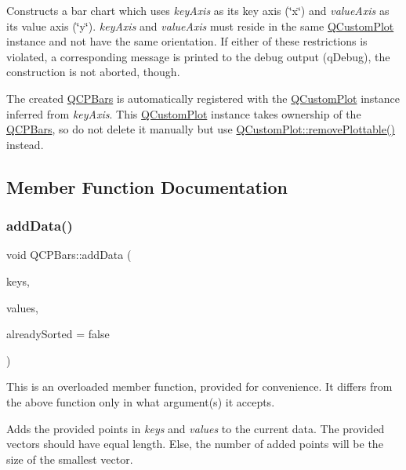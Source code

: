 Constructs a bar chart which uses {\itshape key\+Axis} as its key axis (\char`\"{}x\char`\"{}) and {\itshape value\+Axis} as its value axis (\char`\"{}y\char`\"{}). {\itshape key\+Axis} and {\itshape value\+Axis} must reside in the same \hyperlink{classQCustomPlot}{Q\+Custom\+Plot} instance and not have the same orientation. If either of these restrictions is violated, a corresponding message is printed to the debug output (q\+Debug), the construction is not aborted, though.

The created \hyperlink{classQCPBars}{Q\+C\+P\+Bars} is automatically registered with the \hyperlink{classQCustomPlot}{Q\+Custom\+Plot} instance inferred from {\itshape key\+Axis}. This \hyperlink{classQCustomPlot}{Q\+Custom\+Plot} instance takes ownership of the \hyperlink{classQCPBars}{Q\+C\+P\+Bars}, so do not delete it manually but use \hyperlink{classQCustomPlot_af3dafd56884208474f311d6226513ab2}{Q\+Custom\+Plot\+::remove\+Plottable()} instead. 

\subsection{Member Function Documentation}
\mbox{\label{classQCPBars_a323d6970d6d6e3166d89916a7f60f733}} 
\subsubsection{\texorpdfstring{add\+Data()}{addData()}\hspace{0.1cm}{\footnotesize\ttfamily [1/2]}}
{\footnotesize\ttfamily void Q\+C\+P\+Bars\+::add\+Data (\begin{DoxyParamCaption}\item[{const Q\+Vector$<$ double $>$ \&}]{keys,  }\item[{const Q\+Vector$<$ double $>$ \&}]{values,  }\item[{bool}]{already\+Sorted = {\ttfamily false} }\end{DoxyParamCaption})}

This is an overloaded member function, provided for convenience. It differs from the above function only in what argument(s) it accepts.

Adds the provided points in {\itshape keys} and {\itshape values} to the current data. The provided vectors should have equal length. Else, the number of added points will be the size of the smallest vector.

